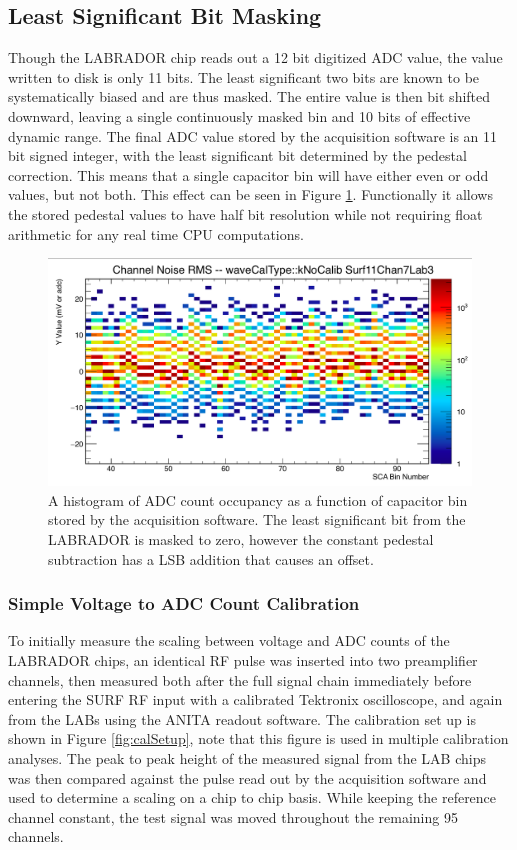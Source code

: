 	\subsection{Least Significant Bit Masking}
		Though the LABRADOR chip reads out a 12 bit digitized ADC value, the value written to disk is only 11 bits. The least significant two bits are known to be systematically biased and are thus masked.  The entire value is then bit shifted downward, leaving a single continuously masked bin and 10 bits of effective dynamic range.  The final ADC value stored by the acquisition software is an 11 bit signed integer, with the least significant bit determined by the pedestal correction.  This means that a single capacitor bin will have either even or odd values, but not both.  This effect can be seen in Figure \ref{fig:evenOddPeds}.  Functionally it allows the stored pedestal values to have half bit resolution while not requiring float arithmetic for any real time CPU computations.
		
		
	\begin{figure}
		\includegraphics[width=\textwidth]{figures/pedsEvenOdd}
		\caption{A histogram of ADC count occupancy as a function of capacitor bin stored by the acquisition software.  The least significant bit from the LABRADOR is masked to zero, however the constant pedestal subtraction has a LSB addition that causes an offset.}
		\label{fig:evenOddPeds}
	\end{figure}
		
	
	
	\subsubsection{Simple Voltage to ADC Count Calibration}
	To initially measure the scaling between voltage and ADC counts of the LABRADOR chips, an identical RF pulse was inserted into two preamplifier channels, then measured both after the full signal chain immediately before entering the SURF RF input with a calibrated Tektronix oscilloscope, and again from the LABs using the ANITA readout software.  The calibration set up is shown in Figure \ref{fig:calSetup}, note that this figure is used in multiple calibration analyses.  The peak to peak height of the measured signal from the LAB chips was then compared against the pulse read out by the acquisition software and used to determine a scaling on a chip to chip basis.  While keeping the reference channel constant, the test signal was moved throughout the remaining 95 channels.
		
